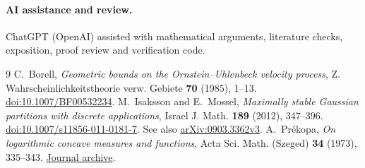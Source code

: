 \documentclass[11pt,reqno]{amsart}
\begin{document}
\paragraph{AI assistance and review.}
ChatGPT (OpenAI) assisted with mathematical arguments, literature checks,
exposition, proof review and verification code.

\begin{thebibliography}{9}
C.~Borell, \emph{Geometric bounds on the Ornstein--Uhlenbeck velocity
process}, Z. Wahrscheinlichkeitstheorie verw. Gebiete \textbf{70}
(1985), 1--13.
\href{https://doi.org/10.1007/BF00532234}{doi:10.1007/BF00532234}.
M.~Isaksson and E.~Mossel,
\emph{Maximally stable Gaussian partitions with discrete applications},
Israel J. Math. \textbf{189} (2012), 347--396.
\href{https://doi.org/10.1007/s11856-011-0181-7}{doi:10.1007/s11856-011-0181-7}.
See also \href{https://arxiv.org/abs/0903.3362v3}{arXiv:0903.3362v3}.
A.~Pr\'ekopa, \emph{On logarithmic concave measures and functions},
Acta Sci. Math. (Szeged) \textbf{34} (1973), 335--343.
\href{https://acta.bibl.u-szeged.hu/14411/}{Journal archive}.
\end{thebibliography}
\end{document}
